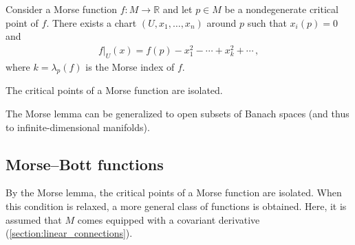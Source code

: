 
    \begin{property}
        Consider a Morse function $f:M\rightarrow\mathbb{R}$ and let $p\in M$ be a nondegenerate critical point of $f$. There exists a chart $(U,x_1,\ldots,x_n)$ around $p$ such that $x_i(p)=0$ and
        \begin{gather}
            f|_U(x) = f(p) - x_1^2-\cdots + x_k^2+\cdots\,,
        \end{gather}
        where $k=\lambda_p(f)$ is the Morse index of $f$.
    \end{property}
    \begin{result}
        The critical points of a Morse function are isolated.
    \end{result}
    \begin{remark}
        The Morse lemma can be generalized to open subsets of Banach spaces (and thus to infinite-dimensional manifolds).
    \end{remark}



\subsection{Morse--Bott functions}

    By the Morse lemma, the critical points of a Morse function are isolated. When this condition is relaxed, a more general class of functions is obtained. Here, it is assumed that $M$ comes equipped with a covariant derivative (\cref{section:linear_connections}).

